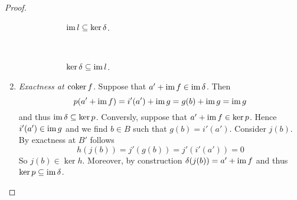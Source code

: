 \begin{proof}
\begin{enumerate}[label = \textit{Step \arabic*:},wide = 0pt]
			\begin{figure}[h!tb]
				\centering
				\begin{subfigure}[b]{.5\textwidth}
					\caption{$\operatorname{im} l \subseteq \ker \delta$.}
					\label{fig:im_l_subseteq_ker_delta}
				\end{subfigure}
				~
				\begin{subfigure}[b]{.5\textwidth}
					\caption{$\ker \delta \subseteq \operatorname{im} l$.}
					\label{fig:ker_delta_subseteq_im_l}					
				\end{subfigure}
				\caption{}
			\end{figure}

		\item \textit{Exactness at $\operatorname{coker} f$.} Suppose that $a' + \operatorname{im} f \in \operatorname{im} \delta$. Then
			\begin{equation*}
				p(a' + \operatorname{im} f) = i'(a') + \operatorname{im} g = g(b) + \operatorname{im} g = \operatorname{im} g 
			\end{equation*}
			\noindent and thus $\operatorname{im} \delta \subseteq \ker p$. Conversly, suppose that $a' + \operatorname{im} f \in \ker p$. Hence $i'(a') \in \operatorname{im} g$ and we find $b \in B$ such that $g(b) = i'(a')$. Consider $j(b)$. By exactness at $B'$ follows
			\begin{equation*}
				h(j(b)) = j'(g(b)) = j'(i'(a')) = 0
			\end{equation*}
			So $j(b) \in \ker h$. Moreover, by construction $\delta(j(b)) = a' + \operatorname{im} f$ and thus $\ker p \subseteq \operatorname{im} \delta$.
	\end{enumerate}
\end{proof}

